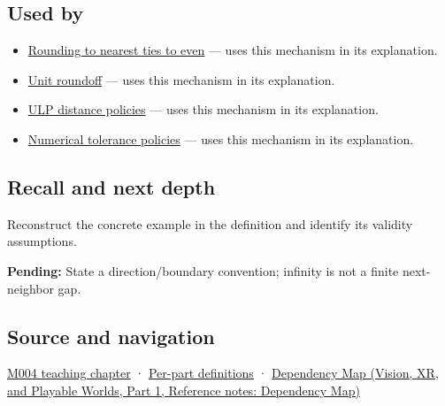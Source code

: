 \subsection{Used by}\label{appendix-14bab4cab9d4-used-by}

\hypertarget{appendix-14bab4cab9d4-used-by}{}

\begin{itemize}
\tightlist
\item
  \hyperref[appendix-614afe1de592]{Rounding to nearest ties to even} --- uses this mechanism in its explanation.
\item
  \hyperref[appendix-bc44f7b42f42]{Unit roundoff} --- uses this mechanism in its explanation.
\item
  \hyperref[appendix-deca299ae4b8]{ULP distance policies} --- uses this mechanism in its explanation.
\item
  \hyperref[appendix-0ec599f8ba27]{Numerical tolerance policies} --- uses this mechanism in its explanation.
\end{itemize}

\subsection{Recall and next depth}\label{appendix-14bab4cab9d4-recall-and-next-depth}

\hypertarget{appendix-14bab4cab9d4-recall-and-next-depth}{}

Reconstruct the concrete example in the definition and identify its validity assumptions.

\textbf{Pending:} State a direction/boundary convention; infinity is not a finite next-neighbor gap.

\subsection{Source and navigation}\label{appendix-14bab4cab9d4-source-and-navigation}

\hypertarget{appendix-14bab4cab9d4-source-and-navigation}{}

\hyperref[01-foundations-i-ch001-a-stretching-ruler-for-real-valued-quantities]{M004 teaching chapter} · \hyperref[appendix-fd090d982a15-m004---parts-61-76]{Per-part definitions} · \href{../07-Vision-XR-and-Playable-Worlds-P01/main.pdf\#appendix-4ad47bdd269a}{Dependency Map (Vision, XR, and Playable Worlds, Part 1, Reference notes: Dependency Map)}
